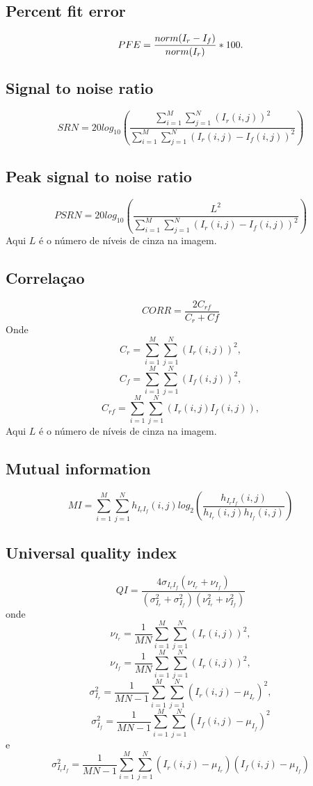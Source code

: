 \subsection{Percent fit error}
\begin{equation}
	PFE=\frac{norm(I_r-I_f)}{norm(I_r)}*100.  \\
\end{equation}
\subsection{Signal to noise ratio}
\begin{equation}
SRN = 20log_{10}\left(\frac{\sum_{i=1}^M\sum_{j=1}^N(I_r(i,j))^2}{\sum_{i=1}^M\sum_{j=1}^N(I_r(i,j)-I_f(i,j))^2}\right)
\end{equation}
\subsection{Peak signal to noise ratio}
\begin{equation}
PSRN = 20log_{10}\left(\frac{L^2}{\sum_{i=1}^M\sum_{j=1}^N(I_r(i,j)-I_f(i,j))^2}\right)
\end{equation}
Aqui $L$ é o número de níveis de cinza na imagem. 
\subsection{Correlaçao}
\begin{equation}
CORR = \frac{2C_{rf}}{C_r+Cf}
\end{equation}
Onde $$C_r= \sum_{i=1}^M\sum_{j=1}^N(I_r(i,j))^2,$$ $$C_f=\sum_{i=1}^M\sum_{j=1}^N(I_f(i,j))^2,$$ $$C_{rf}=\sum_{i=1}^M\sum_{j=1}^N(I_r(i,j)I_f(i,j)),$$
Aqui $L$ é o número de níveis de cinza na imagem. 

\subsection{Mutual information}
\begin{equation}
MI = \sum_{i=1}^M\sum_{j=1}^N h_{I_rI_f}(i,j){log_2\left(\frac{h_{I_rI_f}(i,j)}{h_{I_r}(i,j)h_{I_f}(i,j)}\right)}
\end{equation}
\subsection{Universal quality index}
\begin{equation}
QI=\frac{4\sigma_{I_rI_f}(\nu_{I_r}+\nu_{I_f})}{(\sigma_{I_r}^2+\sigma_{I_f}^2)(\nu_{I_r}^2+\nu_{I_f}^2)}
\end{equation}
onde 
$$\nu_{I_r}=\frac{1}{MN}\sum_{i=1}^M\sum_{j=1}^N(I_r(i,j))^2,$$
$$\nu_{I_f}=\frac{1}{MN}\sum_{i=1}^M\sum_{j=1}^N(I_r(i,j))^2,$$ $$\sigma_{I_r}^2=\frac{1}{MN-1}\sum_{i=1}^M\sum_{j=1}^N(I_r(i,j)-\mu_{I_r})^2,$$
$$\sigma_{I_f}^2   =\frac{1}{MN-1}\sum_{i=1}^M\sum_{j=1}^N(I_f(i,j)-\mu_{I_f})^2$$ e
$$\sigma_{I_rI_f}^2=\frac{1}{MN-1}\sum_{i=1}^M\sum_{j=1}^N(I_r(i,j)-\mu_{I_r})(I_f(i,j)-\mu_{I_f})$$ 
